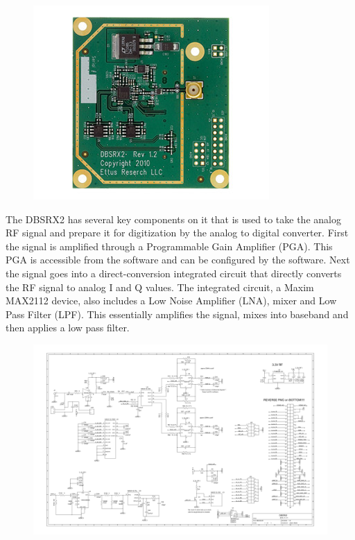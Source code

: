 {\begin{figure}[h!tb] 
\centering
\includegraphics{Images/dbsrx2.jpg}
\label{dbsrx2}
\end{figure}
}

The DBSRX2 has several key components on it that is used to take the analog RF signal and prepare it for digitization by the analog to digital converter.  First the signal is amplified through a Programmable Gain Amplifier (PGA).  This PGA is accessible from the software and can be configured by the software.  Next the signal goes into a direct-conversion integrated circuit that directly converts the RF signal to analog I and Q values.  The integrated circuit, a Maxim MAX2112 device, also includes a Low Noise Amplifier (LNA), mixer and Low Pass Filter (LPF).  This essentially amplifies the signal, mixes into baseband and then applies a low pass filter.  

{\begin{figure}[h!tb] 
\centering
\includegraphics[width=\textwidth]{Images/dbsrx2.pdf}
\label{dbsrx2_sch}
\end{figure}
}

